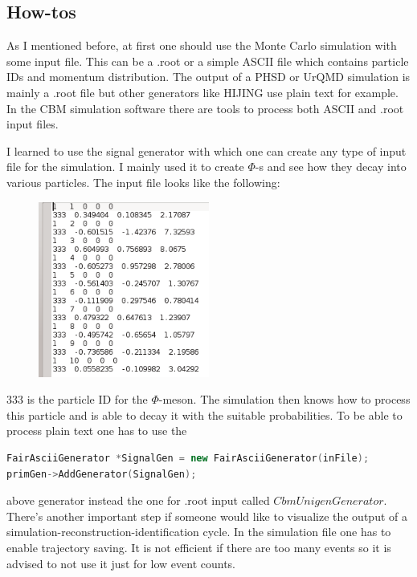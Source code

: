 \documentclass[a4paper,12pt]{article}
\begin{document}
\subsection{ How-tos}
\vspace{3mm}
\par As I mentioned before, at first one should use the Monte Carlo simulation with some input file. This can be a .root or a simple ASCII file which contains particle IDs and momentum distribution. The output of a PHSD or UrQMD simulation is mainly a .root file but other generators like HIJING use plain text for example. In the CBM simulation software there are tools to process both ASCII and .root input files.
\vspace{3mm}
\par I learned to use the signal generator with which one can create any type of input file for the simulation. I mainly used it to create $\Phi$-s and see how they decay into various particles. The input file looks like the following:
\begin{figure}[H]
	\centering
	\includegraphics[width=0.5\textwidth]{input.png}
\end{figure}
\par 333 is the particle ID for the $\Phi$-meson. The simulation then knows how to process this particle and is able to decay it with the suitable probabilities. To be able to process plain text one has to use the
\begin{lstlisting}[language=C++]
FairAsciiGenerator *SignalGen = new FairAsciiGenerator(inFile);
primGen->AddGenerator(SignalGen);
\end{lstlisting}
above generator instead the one for .root input called $CbmUnigenGenerator$. There's another important step if someone would like to visualize the output of a simulation-reconstruction-identification cycle. In the simulation file one has to enable trajectory saving. It is not efficient if there are too many events so it is advised to not use it just for low event counts.
\end{document}
